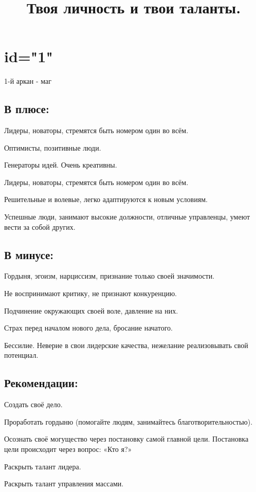 \title{Твоя личность и твои таланты.}

\section{id="1"}{1-й аркан - маг}

\subsection{В плюсе:}
\item Лидеры, новаторы, стремятся быть номером один во всём. 
\item Оптимисты, позитивные люди.    
\item Генераторы идей. Очень креативны.
\item Лидеры, новаторы, стремятся быть номером один во всём. 
\item Решительные и волевые, легко адаптируются к новым условиям. 
\item Успешные люди, занимают высокие должности, отличные управленцы, умеют вести за собой других.
\endsubsection

\subsection{В минусе:}
\item Гордыня, эгоизм, нарциссизм, признание только своей значимости.                  
\item Не воспринимают критику, не признают конкуренцию.                                     
\item Подчинение окружающих своей воле, давление на них.                                   
\item Страх перед началом нового дела, бросание начатого.                                  
\item Бессилие. Неверие в свои лидерские качества, нежелание реализовывать свой потенциал. 
                                                                         
\endsubsection

\subsection{Рекомендации:}
\item Создать своё дело.                                                                                         
\item Проработать гордыню (помогайте людям, занимайтесь благотворительностью).                                    
\item Осознать своё могущество через постановку самой главной цели. Постановка цели происходит через вопрос: «Кто я?»
\item Раскрыть талант лидера.                                                                                     
\item Раскрыть талант управления массами.                                                                         
\endsubsection

